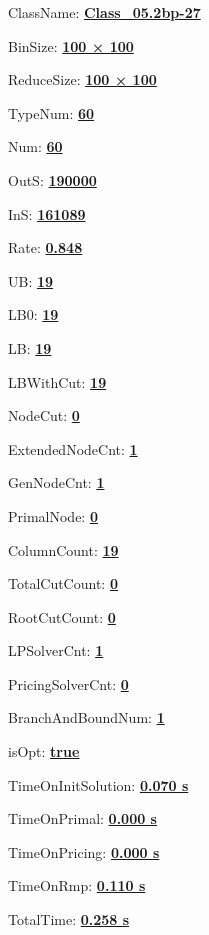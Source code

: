 \documentclass[11pt]{article}
\begin{document}
\pagestyle{empty}


ClassName: \underline{\textbf{Class_05.2bp-27}}
\par
BinSize: \underline{\textbf{100 × 100}}
\par
ReduceSize: \underline{\textbf{100 × 100}}
\par
TypeNum: \underline{\textbf{60}}
\par
Num: \underline{\textbf{60}}
\par
OutS: \underline{\textbf{190000}}
\par
InS: \underline{\textbf{161089}}
\par
Rate: \underline{\textbf{0.848}}
\par
UB: \underline{\textbf{19}}
\par
LB0: \underline{\textbf{19}}
\par
LB: \underline{\textbf{19}}
\par
LBWithCut: \underline{\textbf{19}}
\par
NodeCut: \underline{\textbf{0}}
\par
ExtendedNodeCnt: \underline{\textbf{1}}
\par
GenNodeCnt: \underline{\textbf{1}}
\par
PrimalNode: \underline{\textbf{0}}
\par
ColumnCount: \underline{\textbf{19}}
\par
TotalCutCount: \underline{\textbf{0}}
\par
RootCutCount: \underline{\textbf{0}}
\par
LPSolverCnt: \underline{\textbf{1}}
\par
PricingSolverCnt: \underline{\textbf{0}}
\par
BranchAndBoundNum: \underline{\textbf{1}}
\par
isOpt: \underline{\textbf{true}}
\par
TimeOnInitSolution: \underline{\textbf{0.070 s}}
\par
TimeOnPrimal: \underline{\textbf{0.000 s}}
\par
TimeOnPricing: \underline{\textbf{0.000 s}}
\par
TimeOnRmp: \underline{\textbf{0.110 s}}
\par
TotalTime: \underline{\textbf{0.258 s}}
\par
\newpage


\end{document}
